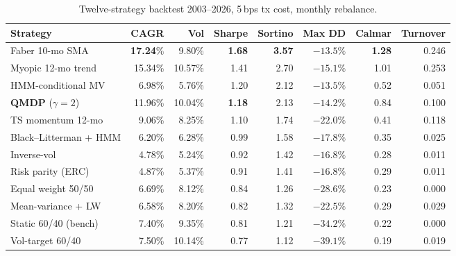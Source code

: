 \documentclass[11pt]{article}
\theoremstyle{plain1}
\theoremstyle{definition1}
\newcommand{\1}{\mathbf{1}}
\begin{document}
\begin{table}[H]\centering\small\setlength{\tabcolsep}{5pt}\renewcommand{\arraystretch}{1.0}
\caption{Twelve-strategy backtest 2003--2026, 5\,bps tx cost, monthly rebalance.}\label{tab:horserace}
\begin{tabular}{l rrrrrrr}
\toprule
\textbf{Strategy} & \textbf{CAGR} & \textbf{Vol} & \textbf{Sharpe} & \textbf{Sortino} & \textbf{Max DD} & \textbf{Calmar} & \textbf{Turnover} \\
\midrule
Faber 10-mo SMA          & \textbf{17.24}\% & 9.80\%  & \textbf{1.68} & \textbf{3.57} & $-13.5\%$ & \textbf{1.28} & 0.246 \\
Myopic 12-mo trend       & 15.34\%          & 10.57\% & 1.41          & 2.70          & $-15.1\%$ & 1.01          & 0.253 \\
HMM-conditional MV       & 6.98\%           & 5.76\%  & 1.20          & 2.12          & $-13.5\%$ & 0.52          & 0.051 \\
\textbf{QMDP} ($\gamma{=}2$) & 11.96\%      & 10.04\% & \textbf{1.18} & 2.13          & $-14.2\%$ & 0.84          & 0.100 \\
TS momentum 12-mo        & 9.06\%           & 8.25\%  & 1.10          & 1.74          & $-22.0\%$ & 0.41          & 0.118 \\
Black--Litterman + HMM   & 6.20\%           & 6.28\%  & 0.99          & 1.58          & $-17.8\%$ & 0.35          & 0.025 \\
Inverse-vol              & 4.78\%           & 5.24\%  & 0.92          & 1.42          & $-16.8\%$ & 0.28          & 0.011 \\
Risk parity (ERC)        & 4.87\%           & 5.37\%  & 0.91          & 1.41          & $-16.8\%$ & 0.29          & 0.011 \\
Equal weight 50/50       & 6.69\%           & 8.12\%  & 0.84          & 1.26          & $-28.6\%$ & 0.23          & 0.000 \\
Mean-variance + LW       & 6.58\%           & 8.20\%  & 0.82          & 1.32          & $-22.5\%$ & 0.29          & 0.029 \\
Static 60/40 (bench)     & 7.40\%           & 9.35\%  & 0.81          & 1.21          & $-34.2\%$ & 0.22          & 0.000 \\
Vol-target 60/40         & 7.50\%           & 10.14\% & 0.77          & 1.12          & $-39.1\%$ & 0.19          & 0.019 \\
\bottomrule
\end{tabular}
\end{table}
\end{document}
